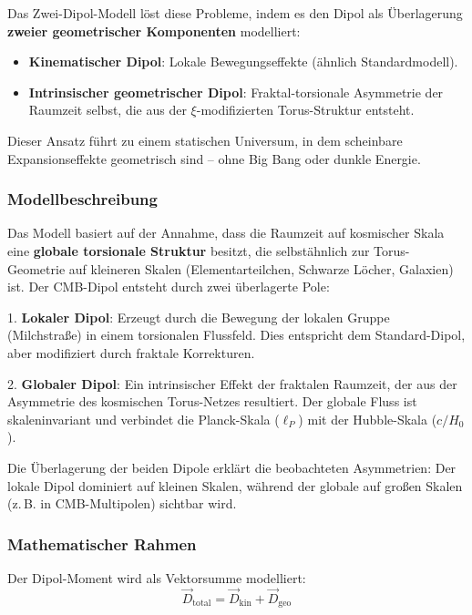 \documentclass[12pt,a4paper]{article}
\begin{document}
	Das Zwei-Dipol-Modell löst diese Probleme, indem es den Dipol als Überlagerung \textbf{zweier geometrischer Komponenten} modelliert:
	\begin{itemize}
		\item \textbf{Kinematischer Dipol}: Lokale Bewegungseffekte (ähnlich Standardmodell).
		\item \textbf{Intrinsischer geometrischer Dipol}: Fraktal-torsionale Asymmetrie der Raumzeit selbst, die aus der $\xi$-modifizierten Torus-Struktur entsteht.
	\end{itemize}
	
	Dieser Ansatz führt zu einem statischen Universum, in dem scheinbare Expansionseffekte geometrisch sind – ohne Big Bang oder dunkle Energie.
	
	\subsubsection{Modellbeschreibung}
	
	Das Modell basiert auf der Annahme, dass die Raumzeit auf kosmischer Skala eine \textbf{globale torsionale Struktur} besitzt, die selbstähnlich zur Torus-Geometrie auf kleineren Skalen (Elementarteilchen, Schwarze Löcher, Galaxien) ist. Der CMB-Dipol entsteht durch zwei überlagerte Pole:
	
	1. \textbf{Lokaler Dipol}: Erzeugt durch die Bewegung der lokalen Gruppe (Milchstraße) in einem torsionalen Flussfeld. Dies entspricht dem Standard-Dipol, aber modifiziert durch fraktale Korrekturen.
	
	2. \textbf{Globaler Dipol}: Ein intrinsischer Effekt der fraktalen Raumzeit, der aus der Asymmetrie des kosmischen Torus-Netzes resultiert. Der globale Fluss ist skaleninvariant und verbindet die Planck-Skala ($\ell_P$) mit der Hubble-Skala ($c/H_0$).
	
	Die Überlagerung der beiden Dipole erklärt die beobachteten Asymmetrien: Der lokale Dipol dominiert auf kleinen Skalen, während der globale auf großen Skalen (z.\,B. in CMB-Multipolen) sichtbar wird.
	
	\subsubsection{Mathematischer Rahmen}
	
	Der Dipol-Moment wird als Vektorsumme modelliert:
	\begin{equation}
		\vec{D}_{\text{total}} = \vec{D}_{\text{kin}} + \vec{D}_{\text{geo}}
		\label{eq:two_dipole}
	\end{equation}
	
\end{document}
